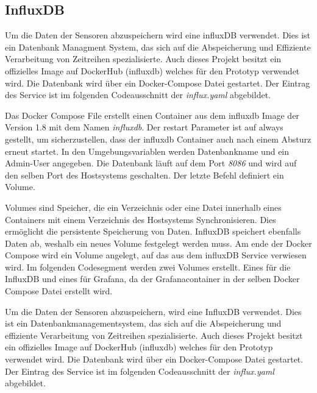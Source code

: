 \documentclass[a4paper, 12pt, oneside, toc=listofnumbered, bibliography=totoc]{scrbook}
\begin{document}
		
		\subsection{InfluxDB}
		
		Um die Daten der Sensoren abzuspeichern wird eine influxDB verwendet. Dies ist ein Datenbank Managment System, das sich auf die Abspeicherung und Effiziente Verarbeitung von Zeitreihen spezialisierte. Auch dieses Projekt besitzt ein offizielles Image auf DockerHub (influxdb) welches für den Prototyp verwendet wird. Die Datenbank wird über ein Docker-Compose Datei gestartet. Der Eintrag des Service ist im folgenden Codeausschnitt der \textit{influx.yaml} abgebildet.
		
		
		
		Das Docker Compose File erstellt einen Container aus dem influxdb Image der Version 1.8 mit dem Namen \textit{influxdb}. Der restart Parameter ist auf always gestellt, um sicherzustellen, dass der influxdb Container auch nach einem Absturz erneut startet. In den Umgebungsvariablen werden Datenbankname und ein Admin-User angegeben. Die Datenbank läuft auf dem Port \textit{8086} und wird auf den selben Port des Hostsystems geschalten. Der letzte Befehl definiert ein Volume. 
		
		Volumes sind Speicher, die ein Verzeichnis oder eine Datei innerhalb eines Containers mit einem Verzeichnis des Hostsystems Synchronisieren. Dies ermöglicht die persistente Speicherung von Daten. InfluxDB speichert ebenfalls Daten ab, weshalb ein neues Volume festgelegt werden muss. Am ende der Docker Compose wird ein Volume angelegt, auf das aus dem influxDB Service verwiesen wird. Im folgenden Codesegment werden zwei Volumes erstellt. Eines für die InfluxDB und eines für Grafana, da der Grafanacontainer in der selben Docker Compose Datei erstellt wird.
		
		
		
		Um die Daten der Sensoren abzuspeichern, wird eine InfluxDB verwendet. Dies ist ein Datenbankmanagementsystem, das sich auf die Abspeicherung und effiziente Verarbeitung von Zeitreihen spezialisierte. Auch dieses Projekt besitzt ein offizielles Image auf DockerHub (influxdb) welches für den Prototyp verwendet wird. Die Datenbank wird über ein Docker-Compose Datei gestartet. Der Eintrag des Service ist im folgenden Codeausschnitt der \textit{influx.yaml} abgebildet.
		
\end{document}
